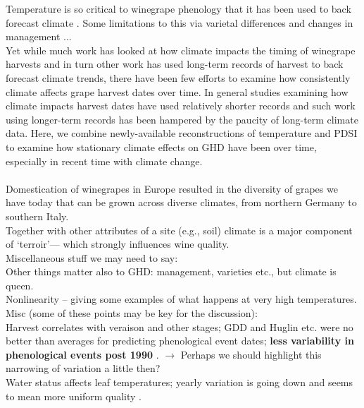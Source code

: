 \documentclass[11pt,a4paper,oneside]{article}
\begin{document}
Temperature is so critical to winegrape phenology that it has been used to back forecast climate \citep[e.g.,][]{Chuine:2004fk,Cortazar-Atauri:2010um}. Some limitations to this via varietal differences and changes in management ... \\

Yet while much work has looked at how climate impacts the timing of winegrape harvests and in turn other work has used long-term records of harvest to back forecast climate trends, there have been few efforts to examine how consistently climate affects grape harvest dates over time. In general studies examining how climate impacts harvest dates have used relatively shorter records \citep[on the scale of 30-40 years, e.g.,][]{Duchene:2005bd,tomasi2011,webb2012} and such work using longer-term records has been hampered by the paucity of long-term climate data. Here, we combine newly-available reconstructions of temperature and PDSI to examine how stationary climate effects on GHD have been over time, especially in recent time with climate change. \\


\\
Domestication of winegrapes in Europe resulted in the diversity of grapes we have today that can be grown across diverse climates, from northern Germany to southern Italy.\\
Together with other attributes of a site (e.g., soil) climate is a major component of `terroir'--- which strongly influences wine quality.\\

\noindent Miscellaneous stuff we may need to say:\\
Other things matter also to GHD: management, varieties etc., but climate is queen.\\
Nonlinearity -- giving some examples of what happens at very high temperatures.\\

\noindent Misc (some of these points may be key for the discussion):
\\
Harvest correlates with veraison and other stages; GDD and Huglin etc. were no better than averages for predicting phenological event dates; {\bf less variability in phenological events post 1990} \citep{tomasi2011}. $\rightarrow$ Perhaps we should highlight this narrowing of variation a little then? \\

Water status affects leaf temperatures; yearly variation is going down and seems to mean more uniform quality \citep{Seguin2005}.


\end{document}

